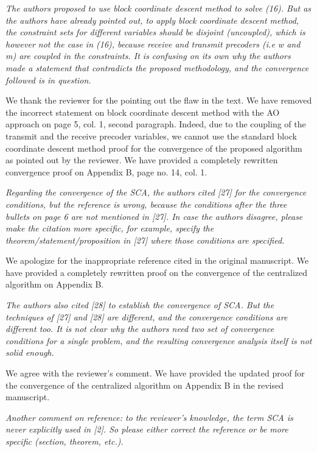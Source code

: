 \begin{itemize}
 \textit{The authors proposed to use block coordinate descent method to solve (16). But as the authors have already pointed out, to apply block coordinate descent method, the constraint sets for different variables should be disjoint (uncoupled), which is however not the case in (16), because receive and transmit precoders (i.e w and m) are coupled in the constraints. It is confusing on its own why the authors made a statement that contradicts the proposed methodology, and the convergence followed is in question.}

\resp We thank the reviewer for the pointing out the flaw in the text. We have removed the incorrect statement on block coordinate descent method with the AO approach on page 5, col. 1, second paragraph. Indeed, due to the coupling of the transmit and the receive precoder variables, we cannot use the standard block coordinate descent method proof for the convergence of the proposed algorithm as pointed out by the reviewer. We have provided a completely rewritten convergence proof on Appendix B, page no. 14, col. 1. 

 \textit{Regarding the convergence of the SCA, the authors cited [27] for the convergence conditions, but the reference is wrong, because the conditions after the three bullets on page 6 are not mentioned in [27]. In case the authors disagree, please make the citation more specific, for example, specify the theorem/statement/proposition in [27] where those conditions are specified.}

\resp We apologize for the inappropriate reference cited in the original manuscript. We have provided a completely rewritten proof on the convergence of the centralized algorithm on Appendix B.

 \textit{The authors also cited [28] to establish the convergence of SCA. But the techniques of [27] and [28] are different, and the convergence conditions are different too. It is not clear why the authors need two set of convergence conditions for a single problem, and the resulting convergence analysis itself is not solid enough.}

\resp We agree with the reviewer's comment. We have provided the updated proof for the convergence of the centralized algorithm on Appendix B in the revised manuscript.

 \textit{Another comment on reference: to the reviewer's knowledge, the term SCA is never explicitly used in [2]. So please either correct the reference or be more specific (section, theorem, etc.).}


\end{itemize}
